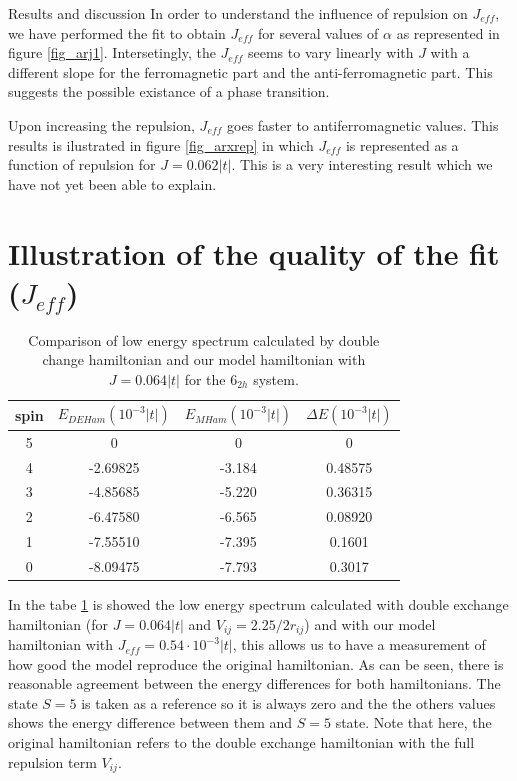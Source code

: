 \documentclass[12pt,twoside]{report}
\begin{document}
\begin{chapter}{Results and discussion}
	In order to understand the influence of repulsion on $J_{eff}$, we have
	performed the fit to obtain $J_{eff}$ for several values of $\alpha$ as
	represented in figure \ref{fig_arj1}. Intersetingly, the $J_{eff}$ seems to
	vary linearly with $J$ with a different slope for the ferromagnetic part and
	the anti-ferromagnetic part. This suggests the possible existance of a phase
	transition.

	Upon increasing the repulsion, $J_{eff}$ goes faster to antiferromagnetic
	values. This results is ilustrated in figure \ref{fig_arxrep} in which
	$J_{eff}$ is represented as a function of repulsion for $J=0.062|t|$. This
	is a very interesting result which we have not yet been able to explain.
   \section{Illustration of the quality of the fit ($J_{eff}$)}
   
   \begin{table}[H]
   \label{spectrum}
	\caption{Comparison of low energy spectrum calculated by double change hamiltonian and our model hamiltonian with $J=0.064|t|$ for the $6_{2h}$ system.}
	\begin{center}
		\begin{tabular}{|c|c|c|c|}
			\hline
			 spin & $E_{DEHam}(10^{-3}|t|)$ & $E_{MHam}(10^{-3}|t|)$ & $\Delta E(10^{-3}|t|)$ \\
			\hline
			5 & 0  & 0  & 0  \\
			\hline
			4 & -2.69825 & -3.184 & 0.48575 \\
			\hline
			3 & -4.85685 & -5.220 & 0.36315 \\
			\hline
			2 & -6.47580 & -6.565 & 0.08920 \\
			\hline
			1 & -7.55510 & -7.395 & 0.1601 \\
			\hline
			0 & -8.09475 & -7.793 & 0.3017  \\
			\hline
		\end{tabular}
	\end{center}
\end{table}

In the tabe \ref{spectrum} is showed the low energy spectrum calculated with
double exchange hamiltonian (for $J=0.064|t|$ and $V_{ij}=2.25 \slash 2 r_{ij}$)
and with our model hamiltonian with $J_{eff}=0.54\cdot10^{-3}|t| $, this allows
us to have a measurement of how good the model reproduce the original
hamiltonian. As can be seen, there is reasonable agreement between the energy
differences for both hamiltonians. The state $S=5$ is taken as a reference so it
is always zero and the the others values shows the energy difference between
them and $S=5$ state. Note that here, the original hamiltonian refers to the
double exchange hamiltonian with the full repulsion term $V_{ij}$.

	\end{chapter} %
	
\end{document}
